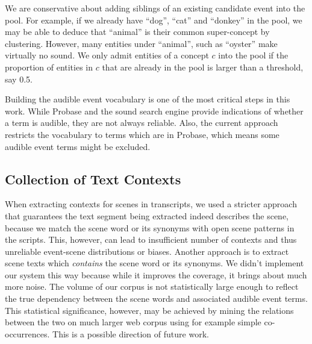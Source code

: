 We are conservative about adding siblings of an existing candidate event into
the pool. For example, if we already have ``dog'', ``cat'' and ``donkey''
in the pool, we may be able to deduce that ``animal'' is their common
super-concept by clustering.
However, many entities under ``animal'', such as ``oyster'' make virtually
no sound. We only admit entities of a concept $c$ into the pool if
the proportion of entities in $c$ that are already in the pool is larger
than a threshold, say 0.5.

Building the audible event vocabulary is one of the most critical steps in
this work. While Probase and the sound search engine provide indications
of whether a term is audible, they are not always reliable. Also, the current
approach restricts the vocabulary to terms which are in Probase, which means
some audible event terms might be excluded.

%

\subsection{Collection of Text Contexts}
When extracting contexts for scenes in transcripts, we used a
stricter approach that guarantees the text segment being extracted indeed
describes the scene, because we match the scene word or its synonyms with
open scene patterns in the scripts. This, however, can lead to insufficient
number of contexts and thus unreliable event-scene distributions or biases.
Another approach is to extract scene texts which {\em contains}
the scene word or its synonyms. We didn't implement our system this way
because while it improves the coverage, it brings about much more noise.
The volume of our corpus is not statistically large enough to reflect the
true dependency between the scene words and associated audible event terms.
This statistical significance, however, may be achieved by mining the relations
between the two on much larger web corpus using for example simple
co-occurrences. This is a possible direction of future work.

